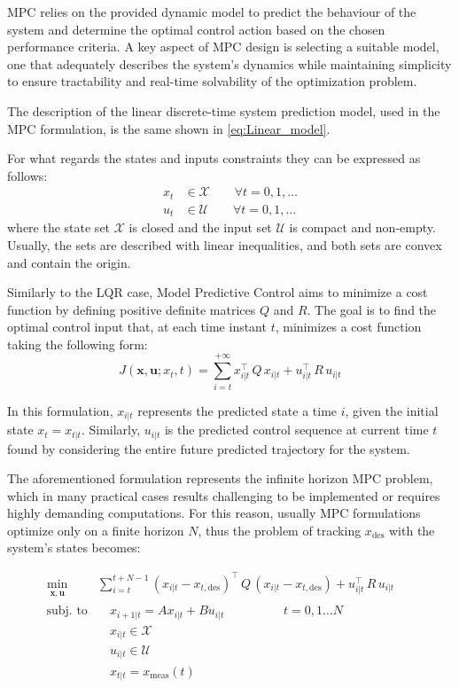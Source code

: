 \documentclass[a4paper,12pt,oneside]{book}
\begin{document}
\bigskip
MPC relies on the provided dynamic model to predict the behaviour of the system and determine the optimal control action based on the chosen performance criteria. 
A key aspect of MPC design is selecting a suitable model, one that adequately describes the system's dynamics while maintaining simplicity to ensure tractability and real-time solvability of the optimization problem.

\bigskip
The description of the linear discrete-time system prediction model, used in the MPC formulation, is the same shown in \eqref{eq:Linear_model}.

For what regards the states and inputs constraints they can be expressed as follows:
\begin{align}
    x_t & \in \mathcal{X} \quad \quad \forall t = 0,1, \ldots \\
    u_t & \in \mathcal{U} \quad \quad \forall t = 0,1, \ldots
\end{align}
where the state set $\mathcal{X}$ is closed and the input set $\mathcal{U}$ is compact and non-empty. 
Usually, the sets are described with linear inequalities, and both sets are convex and contain the origin.

\bigskip
Similarly to the LQR case, Model Predictive Control aims to minimize a cost function by defining positive definite matrices $Q$ and $R$. 
The goal is to find the optimal control input that, at each time instant $t$, minimizes a cost function taking the following form:
\begin{equation}
    J(\boldsymbol{x}, \boldsymbol{u}; x_t, t) = \sum_{i=t} ^{+ \infty} x_{i|t}^\top \, Q \, x_{i|t} + u_{i|t}^\top \, R \, u_{i|t}
\end{equation}

In this formulation, $x_{i|t}$ represents the predicted state a time $i$, given the initial state $x_t = x_{t|t}$. 
Similarly, $u_{i|t}$ is the predicted control sequence at current time $t$ found by considering the entire future predicted trajectory for the system.

\bigskip
The aforementioned formulation represents the infinite horizon MPC problem, which in many practical cases results challenging to be implemented or requires highly demanding computations.
For this reason, usually MPC formulations optimize only on a finite horizon $N$, thus the problem of tracking $x_{\text{des}}$ with the system's states becomes:

\begin{equation}
\begin{alignedat}{2}
	\min_{\substack{\boldsymbol{x}, \boldsymbol{u}}}\quad & \sum_{i=t}^{t+N-1} (x_{i|t} - x_{t,\text{des}}) ^\top \, Q \, (x_{i|t} - x_{t,\text{des}}) +  u_{i|t}^\top \, R \, u_{i|t} &&   \\
	\text{subj. to} & \quad x_{i+1|t}  = A x_{i|t} + B u_{i|t}   \hspace{2cm} t = 0, 1 \ldots N &&  \\
     &\quad x_{i|t} \in \mathcal{X} && \\
    &\quad u_{i|t} \in \mathcal{U} && \\
    &\quad x_{t|t} = x_{\text{meas}}(t) && 
\end{alignedat}
\label{MPC1}
\end{equation}
\end{document}
